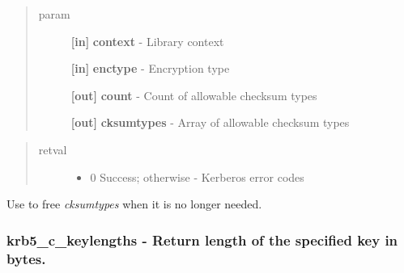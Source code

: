 \documentclass[letterpaper,10pt,english]{sphinxmanual}
\begin{document}
\begin{quote}\begin{description}
\item[{param}] \leavevmode
\textbf{{[}in{]}} \textbf{context} - Library context

\textbf{{[}in{]}} \textbf{enctype} - Encryption type

\textbf{{[}out{]}} \textbf{count} - Count of allowable checksum types

\textbf{{[}out{]}} \textbf{cksumtypes} - Array of allowable checksum types

\end{description}\end{quote}
\begin{quote}\begin{description}
\item[{retval}] \leavevmode\begin{itemize}
\item {} 
0   Success; otherwise - Kerberos error codes

\end{itemize}

\end{description}\end{quote}

Use {\hyperref[appdev/refs/api/krb5_free_cksumtypes:krb5_free_cksumtypes]{}} to free \emph{cksumtypes} when it is no longer needed.


\subsubsection{krb5\_c\_keylengths -  Return length of the specified key in bytes.}
\label{appdev/refs/api/krb5_c_keylengths::doc}\label{appdev/refs/api/krb5_c_keylengths:krb5-c-keylengths-return-length-of-the-specified-key-in-bytes}

\begin{fulllineitems}
\label{appdev/refs/api/krb5_c_keylengths:krb5_c_keylengths}
\end{fulllineitems}
\end{document}
